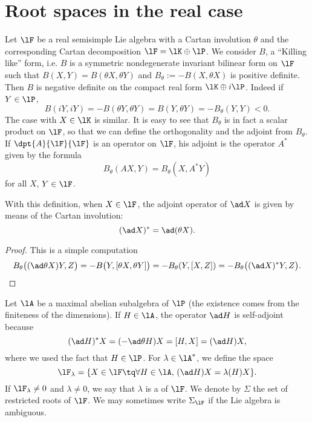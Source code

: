 \section{Root spaces in the real case}

Let $\lF$ be a real semisimple Lie algebra with a Cartan involution $\theta$ and the corresponding Cartan decomposition $\lF=\lK\oplus\lP$. We consider $B$, a ``Killing like''{} form, i.e. $B$ is a symmetric nondegenerate invariant bilinear form on $\lF$ such that $B(X,Y)=B(\theta X,\theta Y)$ and $B_{\theta}:=-B(X,\theta X)$ is positive definite. Then $B$ is negative definite on the compact real form $\lK\oplus i\lP$. Indeed if $Y\in\lP$,
\begin{equation}
  B(iY,iY)=-B(\theta Y,\theta Y)
          =B(Y,\theta Y)
      =-B_{\theta}(Y,Y)<0.
\end{equation}
The case with $X\in\lK$ is similar. It is easy to see that $B_{\theta}$ is in fact a scalar product on $\lF$, so that we can define the orthogonality and the adjoint from $B_{\theta}$. If $\dpt{A}{\lF}{\lF}$ is an operator on $\lF$, his adjoint is the operator $A^*$ given by the formula
\[
   B_{\theta}(A X,Y)=B_{\theta}(X,A^*Y)
\]
for all $X$, $Y\in\lF$.

\begin{proposition}
With this definition, when $X\in\lF$, the adjoint operator of $\ad X$ is given by means of the Cartan involution:
\[
(\ad X)^*= \ad(\theta X).
\]
\end{proposition}

\begin{proof}
This is a simple computation
\begin{equation}
B_{\theta}\big(  (\ad\theta X)Y,Z \big)=-B\big(  Y,[\theta X,\theta Y]  \big)
                                     =-B_{\theta}(Y,[X,Z])
                     =-B_{\theta}\big( (\ad X)^*Y,Z \big).
\end{equation}
\end{proof}

Let $\lA$ be a maximal abelian subalgebra of $\lP$ (the existence comes from the finiteness of the dimensions). If $H\in\lA$, the operator $\ad H$ is self-adjoint because
\begin{equation}
(\ad H)^*X=(-\ad\theta H)X
          =[H,X]
      =(\ad H)X,
\end{equation}
where we used the fact that $H\in\lP$.  For $\lambda\in\lA^*$, we define the space
\begin{equation}
  \lF_{\lambda}=\{ X\in\lF\tq\forall H\in\lA,\, (\ad H)X=\lambda(H)X\}.
\end{equation}
If $\lF_{\lambda}\neq 0$ and $\lambda\neq 0$, we say that $\lambda$ is a  of $\lF$. We denote by $\Sigma$ the set of restricted roots of $\lF$. We may sometimes write $\Sigma_{\lF}$ if the Lie algebra is ambiguous.

